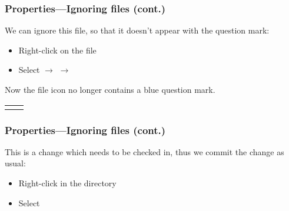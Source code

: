 \begin{frame}[fragile]
    \frametitle{Properties---Ignoring files (cont.)}

    We can ignore this file, so that it doesn't appear with the question
    mark:
    \begin{itemize}
        \item Right-click on the file
        \item Select  $\rightarrow$
             $\rightarrow$ 
    \end{itemize}
    Now the file icon no longer contains a blue question mark.

    \begin{center}
        \begin{tabularx}{\textwidth}{cX}
            &
        \end{tabularx}
    \end{center}
\end{frame}

\begin{frame}[fragile]
    \frametitle{Properties---Ignoring files (cont.)}

    This is a change which needs to be checked in, thus we commit the
    change as usual:
    \begin{itemize}
        \item Right-click in the directory
        \item Select 
    \end{itemize}

    \begin{center}
    \end{center}
\end{frame}


